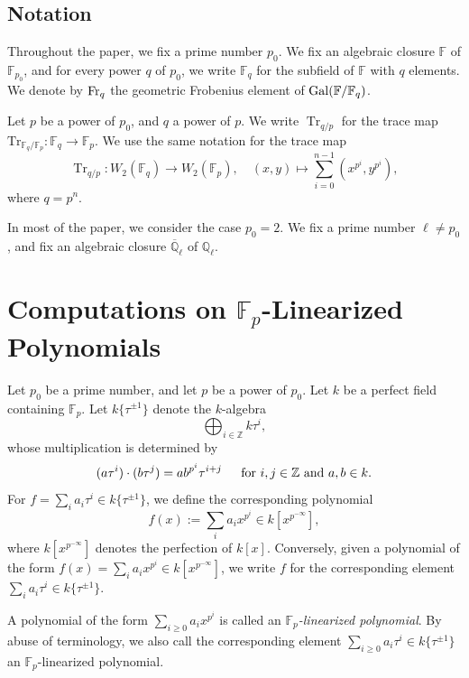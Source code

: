 \documentclass[12pt,a4paper]{amsart}
\theoremstyle{definition}
\def\F{{\mathbb F}}
\def\Ql{\overline{\mathbb{Q}}_\ell}
\theoremstyle{remark}
\DeclareMathOperator{\Tr}{Tr}
\begin{document}
\subsection*{Notation}
Throughout the paper,
we fix a prime number $p_0$. 
We fix an algebraic closure $\mathbb{F}$ of $\mathbb{F}_{p_0}$, and for every power $q$ of $p_0$, we write $\F_q$ for the subfield of $\F$ with $q$ elements. We denote by ${\rm Fr}_q$ the geometric Frobenius element of ${\rm Gal}(\F/\F_q)$. 

Let $p$ be a power of $p_0$, and $q$ a power of $p$. We write $\Tr_{q/p}$ for the trace map 
$\mathrm{Tr}_{\mathbb{F}_{q}/\mathbb{F}_p} \colon \mathbb{F}_{q} \to \mathbb{F}_p$. 
We  use the same notation for the trace map 
\[
\Tr_{q/p}\colon W_2(\F_q)\to W_2(\F_p),\quad (x,y)\mapsto \sum_{i=0}^{n-1}(x^{p^i},y^{p^i}), 
\]
where $q=p^n$. 

In most of the paper, we consider the case $p_0 = 2$. 
We fix a prime number $\ell\neq p_0$, and fix an algebraic closure $\Ql$ of $\mathbb{Q}_\ell$. 



 

\section{Computations on $\F_p$-Linearized Polynomials}
\label{linearized}

Let $p_0$ be a prime number, and let $p$ be a power of $p_0$. Let $k$ be a perfect field containing $\F_p$. 
Let  $k\{\tau^{\pm1}\}$ denote the $k$-algebra 
\[\bigoplus_{i\in\mathbb{Z}}k\tau^i,\]
whose multiplication is determined by 
\[(a\tau^i)\cdot (b\tau^j)=ab^{p^i}\tau^{i+j} \text{ \hspace{3mm} for $i,j\in \mathbb{Z}$ and $a,b\in k$.}\] 
For $f=\sum_ia_i\tau^i\in k\{\tau^{\pm1}\}$, we define the corresponding polynomial 
\[
f(x):=\sum_ia_ix^{p^i}\in k[x^{p^{-\infty}}],  \]
where $k[x^{p^{-\infty}}]$ denotes the perfection of $k[x]$. 
Conversely, given a polynomial of the form $f(x)=\sum_ia_ix^{p^i}\in k[x^{p^{-\infty}}]$, we write $f$ for the corresponding element $\sum_ia_i\tau^i\in k\{\tau^{\pm1}\}$. 


A polynomial of the form $\sum_{i\geq0}a_ix^{p^i}$ is called an \emph{$\F_p$-linearized polynomial}. 
By abuse of terminology, we also call the corresponding element $\sum_{i\geq0}a_i\tau^i\in k\{\tau^{\pm1}\}$ an $\F_p$-linearized polynomial. 
\end{document}
